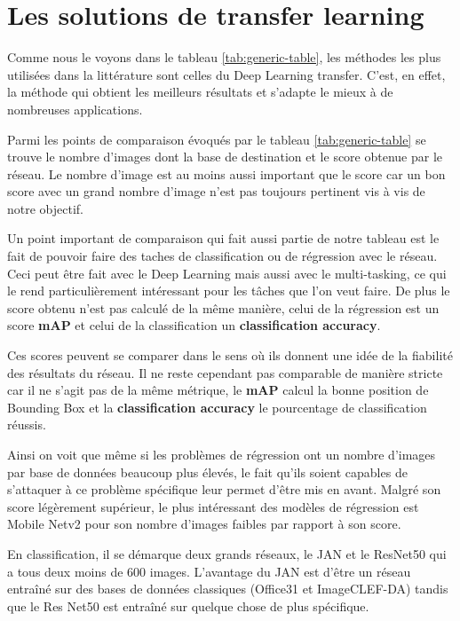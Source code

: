 \section{Les solutions de transfer learning}
\label{sec:analyse-transfer-learning}

Comme nous le voyons dans le tableau \ref{tab:generic-table}, les méthodes les plus utilisées dans la littérature sont celles du Deep Learning transfer. C'est, en effet, la méthode qui obtient les meilleurs résultats et s'adapte le mieux à de nombreuses applications.

Parmi les points de comparaison évoqués par le tableau \ref{tab:generic-table} se trouve le nombre d'images dont la base de destination et le score obtenue par le réseau. Le nombre d'image est au moins aussi important que le score car un bon score avec un grand nombre d'image n'est pas toujours pertinent vis à vis de notre objectif. 

Un point important de comparaison qui fait aussi partie de notre tableau est le fait de pouvoir faire des taches de classification ou de régression avec le réseau. Ceci peut être fait avec le Deep Learning mais aussi avec le multi-tasking, ce qui le rend particulièrement intéressant pour les tâches que l'on veut faire. De plus le score obtenu n'est pas calculé de la même manière, celui de la régression est un score \textbf{mAP} et celui de la classification un \textbf{classification accuracy}.

Ces scores peuvent se comparer dans le sens où ils donnent une idée de la fiabilité des résultats du réseau. Il ne reste cependant pas comparable de manière stricte car il ne s'agit pas de la même métrique, le \textbf{mAP} calcul la bonne position de Bounding Box et la \textbf{classification accuracy} le pourcentage de classification réussis.

Ainsi on voit que même si les problèmes de régression ont un nombre d'images par base de données beaucoup plus élevés, le fait qu'ils soient capables de s'attaquer à ce problème spécifique leur permet d'être mis en avant. Malgré son score légèrement supérieur, le plus intéressant des modèles de régression est Mobile Netv2 pour son nombre d'images faibles par rapport à son score.

En classification, il se démarque deux grands réseaux, le JAN et le ResNet50 qui a tous deux moins de 600 images. L'avantage du JAN est d'être un réseau entraîné sur des bases de données classiques (Office31 et ImageCLEF-DA) tandis que le Res Net50 est entraîné sur quelque chose de plus spécifique.

